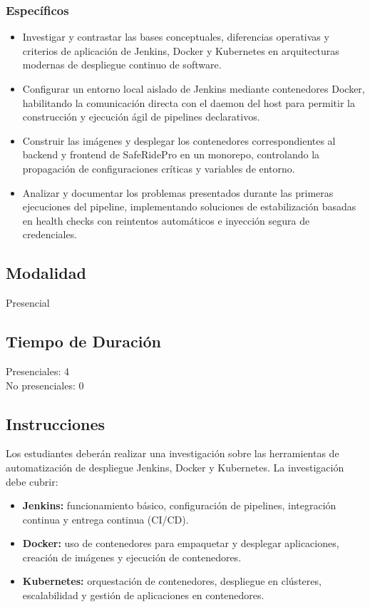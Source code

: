 \documentclass{article}
\begin{document}
\subsubsection{Específicos}
\begin{itemize}
    \item Investigar y contrastar las bases conceptuales, diferencias operativas y criterios de aplicación de Jenkins, Docker y Kubernetes en arquitecturas modernas de despliegue continuo de software.
    \item Configurar un entorno local aislado de Jenkins mediante contenedores Docker, habilitando la comunicación directa con el daemon del host para permitir la construcción y ejecución ágil de pipelines declarativos.
    \item Construir las imágenes y desplegar los contenedores correspondientes al backend y frontend de SafeRidePro en un monorepo, controlando la propagación de configuraciones críticas y variables de entorno.
    \item Analizar y documentar los problemas presentados durante las primeras ejecuciones del pipeline, implementando soluciones de estabilización basadas en health checks con reintentos automáticos e inyección segura de credenciales.
\end{itemize}

\subsection{Modalidad}
Presencial

\subsection{Tiempo de Duración}
Presenciales: 4\\
\indent No presenciales: 0

\subsection{Instrucciones}
Los estudiantes deberán realizar una investigación sobre las herramientas de automatización de despliegue Jenkins, Docker y Kubernetes. La investigación debe cubrir:

\begin{itemize}
    \item \textbf{Jenkins:} funcionamiento básico, configuración de pipelines, integración continua y entrega continua (CI/CD).
    \item \textbf{Docker:} uso de contenedores para empaquetar y desplegar aplicaciones, creación de imágenes y ejecución de contenedores.
    \item \textbf{Kubernetes:} orquestación de contenedores, despliegue en clústeres, escalabilidad y gestión de aplicaciones en contenedores.
\end{itemize}
\end{document}

